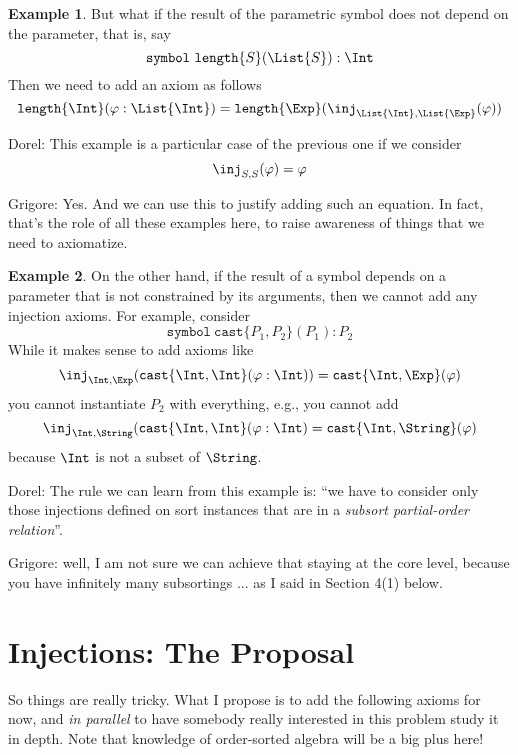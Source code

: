 \documentclass{article}
\newcommand\comment[2]{\par\noindent\color{red}#1: #2\color{black}\par\noindent}
\newcommand\dl{\comment{Dorel}}
\newcommand\gr{\comment{Grigore}}
\theoremstyle{definition}
\newtheorem{example}{Example}[section]
\theoremstyle{definition}
\theoremstyle{definition}
\theoremstyle{definition}
\theoremstyle{theorem}
\theoremstyle{theorem}
\theoremstyle{theorem}
\theoremstyle{theorem}
\theoremstyle{theorem}
\newcommand{\poly}[2]{\texttt{#1}\{#2\}}
\newcommand{\KWsymbol}{\texttt{symbol}}
\begin{document}
\begin{example}\label{consistency-parametric-arg-only}
But what if the result of the parametric symbol
does not depend on the parameter, that is, say
\[\KWsymbol\ \poly{length}{S}(\List{S}):\Int\]
Then we need to add an axiom as follows
\[\poly{length}{\Int}(\varphi:\List{\Int})
= \poly{length}{\Exp}(\inj_{\List{\Int},\List{\Exp}}(\varphi))\]
\dl{This example is a particular case of the previous one if we consider
\[\inj_{S,S}(\varphi)=\varphi\]
}
\gr{Yes.  And we can use this to justify adding such an equation.  In fact, that's the role of all these examples here, to raise awareness of things that we need to axiomatize.}
\end{example}

\begin{example}\label{consistency-parametric-result-free}
On the other hand, if the result of a symbol depends on
a parameter that is not constrained by its arguments,
then we cannot add any injection axioms.
For example, consider
\[\KWsymbol\ \poly{cast}{P_1,P_2}(P_1):P_2\]
While it makes sense to add axioms like
\[\inj_{\Int,\Exp}(\poly{cast}{\Int,\Int}(\varphi:\Int))
= \poly{cast}{\Int,\Exp}(\varphi)\]
you cannot instantiate \(P_2\) with everything, e.g., you cannot add
\[\inj_{\Int,\String}(\poly{cast}{\Int,\Int}(\varphi:\Int)
= \poly{cast}{\Int,\String}(\varphi)\]
because \(\Int\) is not a subset of \(\String\).
\dl{The rule we can learn from this example is: ``we have to consider only those injections defined on sort instances that are in a \emph{subsort partial-order relation}''.
}
\gr{well, I am not sure we can achieve that staying at the core level, because you have infinitely many subsortings ...
as I said in Section 4(1) below.}
\end{example}

\section{Injections: The Proposal}
\label{sec:proposal}
So things are really tricky.
What I propose is to add the following axioms for now,
and \emph{in parallel} to have somebody really interested in this
problem study it in depth.
Note that knowledge of order-sorted algebra will be a big plus here!
\end{document}

